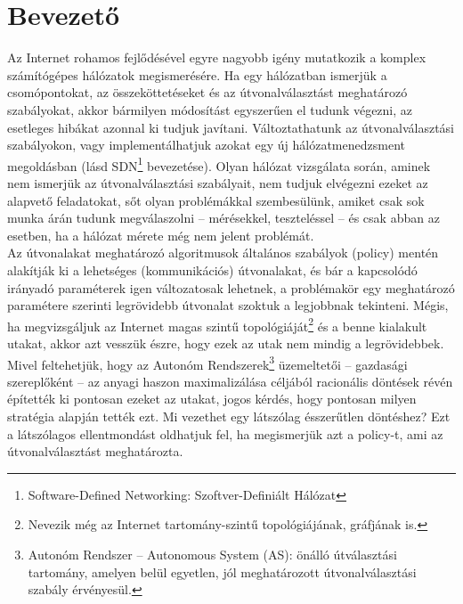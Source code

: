 \chapter*{Bevezető}
Az Internet rohamos fejlődésével egyre nagyobb igény mutatkozik a komplex számítógépes hálózatok megismerésére. Ha egy hálózatban ismerjük a csomópontokat, az összeköttetéseket és az útvonalválasztást meghatározó szabályokat, akkor bármilyen módosítást egyszerűen el tudunk végezni, az esetleges hibákat azonnal ki tudjuk javítani. Változtathatunk az útvonalválasztási szabályokon, vagy implementálhatjuk azokat egy új hálózatmenedzsment megoldásban (lásd SDN\footnote{Software-Defined Networking: Szoftver-Definiált Hálózat} bevezetése\cite{sdn-deploy}). Olyan hálózat vizsgálata során, aminek nem ismerjük az útvonalválasztási szabályait, nem tudjuk elvégezni ezeket az alapvető feladatokat, sőt olyan problémákkal szembesülünk, amiket csak sok munka árán tudunk megválaszolni -- mérésekkel, teszteléssel -- és csak abban az esetben, ha a hálózat mérete még nem jelent problémát.\\

Az útvonalakat meghatározó algoritmusok általános szabályok (policy) mentén alakítják ki a lehetséges (kommunikációs) útvonalakat, és bár a kapcsolódó irányadó paraméterek igen változatosak lehetnek, a problémakör egy meghatározó paramétere szerinti legrövidebb útvonalat szoktuk a legjobbnak tekinteni. Mégis, ha megvizsgáljuk az Internet magas szintű topológiáját\footnote{Nevezik még az Internet tartomány-szintű topológiájának, gráfjának is.} és a benne kialakult utakat, akkor azt vesszük észre, hogy ezek az utak nem mindig a legrövidebbek. Mivel feltehetjük, hogy az Autonóm Rendszerek\footnote{Autonóm Rendszer -- Autonomous System (AS): önálló útválasztási tartomány, amelyen belül egyetlen, jól meghatározott útvonalválasztási szabály érvényesül.} üzemeltetői -- gazdasági szereplőként -- az anyagi haszon maximalizálása céljából racionális döntések révén építették ki pontosan ezeket az utakat, jogos kérdés, hogy pontosan milyen stratégia alapján tették ezt. Mi vezethet egy látszólag ésszerűtlen döntéshez? Ezt a látszólagos ellentmondást oldhatjuk fel, ha megismerjük azt a policy-t, ami az útvonalválasztást meghatározta.\\

